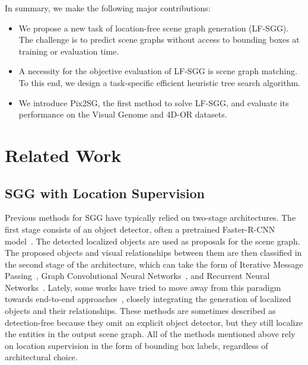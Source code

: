 \documentclass[10pt,twocolumn,letterpaper]{article}
\begin{document}
\noindent In summary, we make the following major contributions:

\begin{itemize}
\item We propose a new task of location-free scene graph generation (LF-SGG). The challenge is to predict scene graphs without access to bounding boxes at training or evaluation time.
\item A necessity for the objective evaluation of LF-SGG is scene graph matching. To this end, we design a task-specific efficient heuristic tree search algorithm.
\item We introduce Pix2SG, the first method to solve LF-SGG, and evaluate its performance on the Visual Genome and 4D-OR datasets.

\end{itemize}

 \section{Related Work} 

\subsection{SGG with Location Supervision}
Previous methods for SGG have typically relied on two-stage architectures. The first stage consists of an object detector, often a pretrained Faster-R-CNN model~\cite{ren_faster_2016}.
The detected localized objects are used as proposals for the scene graph. The proposed objects and visual relationships between them are then classified in the second stage of the architecture, which can take the form of Iterative Message Passing~\cite{xu_scene_2017, zareian_weakly_2020}, Graph Convolutional Neural Networks~\cite{zhang_graphical_2019, lin_gps-net_2020, yang_graph_2018, wald_learning_2020, wu_scenegraphfusion_2021}, and Recurrent Neural Networks~\cite{zellers_neural_2018, tang_learning_2019}.
Lately, some works have tried to move away from this paradigm towards end-to-end approaches~\cite{teng_structured_2022, cong_reltr_2022, shit_relationformer_2022, yang_panoptic_2022}, closely integrating the generation of localized objects and their relationships. These methods are sometimes described as detection-free because they omit an explicit object detector, but they still localize the entities in the output scene graph. All of the methods mentioned above rely on location supervision in the form of bounding box labels, regardless of architectural choice.
\end{document}

